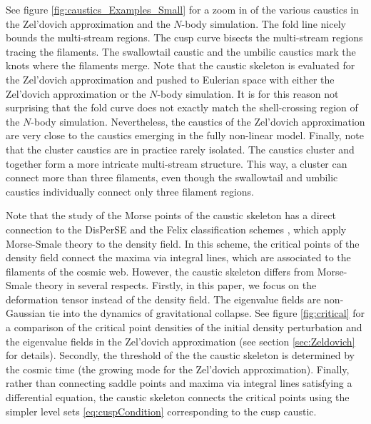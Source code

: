 \documentclass[a4paper, 11pt]{article}
\begin{document}
See figure \ref{fig:caustics_Examples_Small} for a zoom in of the various caustics in the Zel'dovich approximation and the $N$-body simulation. The fold line nicely bounds the multi-stream regions. The cusp curve bisects the multi-stream regions tracing the filaments. The swallowtail caustic and the umbilic caustics mark the knots where the filaments merge. Note that the caustic skeleton is evaluated for the Zel'dovich approximation and pushed to Eulerian space with either the Zel'dovich approximation or the $N$-body simulation. It is for this reason not surprising that the fold curve does not exactly match the shell-crossing region of the $N$-body simulation. Nevertheless, the caustics of the Zel'dovich approximation are very close to the caustics emerging in the fully non-linear model. Finally, note that the cluster caustics are in practice rarely isolated. The caustics cluster and together form a more intricate multi-stream structure. This way, a cluster can connect more than three filaments, even though the swallowtail and umbilic caustics individually connect only three filament regions.




\bigskip
Note that the study of the Morse points of the caustic skeleton has a direct connection to the DisPerSE and the Felix classification schemes \cite{Pogosyan:2009, Sousbie:2011a, Sousbie:2011b, Shivashankar:2016}, which apply Morse-Smale theory to the density field. In this scheme, the critical points of the density field connect the maxima via integral lines, which are associated to the filaments of the cosmic web. However, the caustic skeleton differs from Morse-Smale theory in several respects. Firstly, in this paper, we focus on the deformation tensor instead of the density field. The eigenvalue fields are non-Gaussian tie into the dynamics of gravitational collapse. See figure \ref{fig:critical} for a comparison of the critical point densities of the initial density perturbation and the eigenvalue fields in the Zel'dovich approximation (see section \ref{sec:Zeldovich} for details). Secondly, the threshold of the the caustic skeleton is determined by the cosmic time (the growing mode for the Zel'dovich approximation). Finally, rather than connecting saddle points and maxima via integral lines satisfying a differential equation, the caustic skeleton connects the critical points using the simpler level sets \eqref{eq:cuspCondition} corresponding to the cusp caustic.
\end{document}

